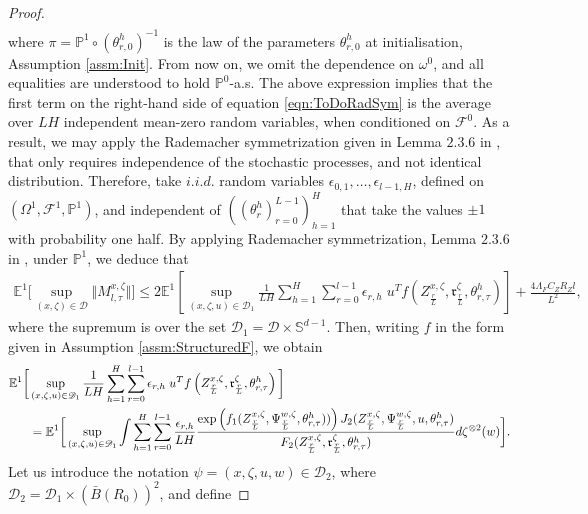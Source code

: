 \documentclass{article}
\begin{document}
\begin{appendices}
\begin{proof}
\begin{align*}
\end{align*}
where $\pi = \mathbb P^1\circ (\theta^h_{r,0})^{-1}$ is the law of the parameters $\theta^h_{r,0}$ at initialisation, Assumption \ref{assm:Init}. From now on, we omit the dependence on $\omega^0$, and all equalities are understood to hold $\mathbb P^0$-a.s. The above expression implies that the first term on the right-hand side of equation \eqref{eqn:ToDoRadSym} is the average over $LH$ independent mean-zero random variables, when conditioned on $\mathcal F^0$. As a result, we may apply the Rademacher symmetrization given in Lemma $2.3.6$ in \cite{vanderVaart1996}, that only requires independence of the stochastic processes, and not identical distribution. Therefore, take $i.i.d.$ random variables $\epsilon_{0,1},\ldots,\epsilon_{l-1,H}$, defined on $(\Omega^1,\mathcal F^1,\mathbb P^1)$, and independent of $((\theta^h_r)_{r=0}^{L-1})_{h=1}^H$ that take the values $\pm 1$ with probability one half. By applying Rademacher symmetrization, Lemma $2.3.6$ in \cite{vanderVaart1996}, under $\mathbb P^1$, we deduce that 
    \begin{align}
            \mathbb E^1\bigg[\sup_{(x,\zeta)\in \mathscr D}\Vert M^{x,\zeta}_{l,\tau}\Vert \bigg]\le 2\mathbb E^1\left[ \sup_{(x,\zeta,u)\in \mathscr D_1}\frac{1}{LH}\sum_{h=1}^H\sum_{r=0}^{l-1}\epsilon_{r,h}\;u^Tf\left(Z^{x,\zeta}_\frac{r}{L},\mathfrak{r}^\zeta_\frac{r}{L},\theta_{r,\tau}^h\right)\right]+ \frac{4\Lambda_FC_Z R_Z l}{L^2},
    \end{align}
where the supremum is over the set $\mathscr D_1=\mathscr D\times \mathbb S^{d-1}$. Then, writing $f$ in the form given in Assumption \ref{assm:StructuredF}, we obtain
    \begin{align*}
    \mathbb E^1\bigg[ &\sup_{(x,\zeta,u)\in \mathscr D_1}\frac{1}{LH}\sum_{h=1}^H\sum_{r=0}^{l-1}\epsilon_{r,h}\;u^Tf\left(Z^{x,\zeta}_\frac{r}{L},\mathfrak{r}^{\zeta}_\frac{r}{L},\theta_{r,\tau}^h\right)\bigg]\\
    &=  \mathbb E^1\bigg[ \sup_{(x,\zeta,u)\in \mathscr D_1}\int\sum_{h=1}^H\sum_{r=0}^{l-1}\frac{\epsilon_{r,h}}{LH}\frac{ \exp\left(f_1(Z^{x,\zeta}_\frac{r}{L},\Psi^{w,\zeta}_\frac{r}{L},\theta^h_{r,\tau}))\right)J_2(Z^{x,\zeta}_\frac{r}{L},\Psi^{w,\zeta}_\frac{r}{L},u,\theta^h_{r,\tau})}{F_2(Z^{x,\zeta}_\frac{r}{L},\mathfrak{r}^\zeta_\frac{r}{L},\theta^h_{r,\tau})}d\zeta^{\otimes 2}(w)\bigg].\notag
    \end{align*}
Let us introduce the notation $\psi=(x,\zeta,u,w)\in \mathscr{D}_2$, where $\mathscr D_2=\mathscr D_1\times (\bar B(R_0))^2$, and define

\end{proof}
\end{appendices}
\end{document}
